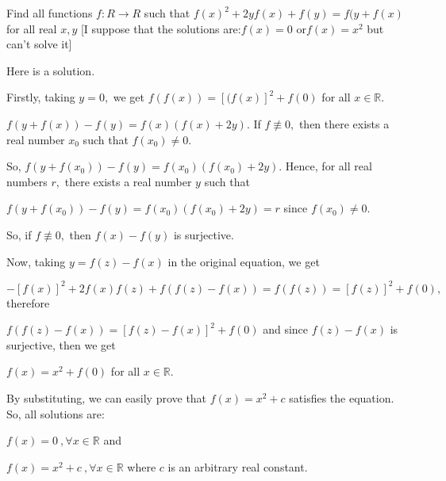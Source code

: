 \begin{solution}
	\begin{tcolorbox}Find all functions $f:R\rightarrow R $ such that $f(x)^2 +2yf(x)+f(y)=f(y+f(x)$ for all real $x,y$
[I suppose that the solutions are:$f(x)=0$ or$f(x)=x^2$ but can't solve it]\end{tcolorbox}
Here is a solution.

Firstly, taking $y=0,$ we get $f(f(x))=[(f(x)]^2+f(0)$ for all $x \in \mathbb{R}.$

$f(y+f(x))-f(y)=f(x)(f(x)+2y).$ If $f \not\equiv 0,$ then there exists a real number $x_0$ such that $f(x_0) \neq 0.$

So, $f(y+f(x_0))-f(y)=f(x_0)(f(x_0)+2y).$ Hence, for all real numbers $r,$ there exists a real number $y$ such that

$f(y+f(x_0))-f(y)=f(x_0)(f(x_0)+2y)=r$ since $f(x_0) \neq 0.$ 

So, if $f \not\equiv 0,$ then $f(x)-f(y)$ is surjective.

Now, taking $y=f(z)-f(x)$ in the original equation, we get

$-[f(x)]^2+2f(x)f(z)+f(f(z)-f(x))=f(f(z))=[f(z)]^2+f(0),$ therefore

$f(f(z)-f(x))=[f(z)-f(x)]^2+f(0)$ and since $f(z)-f(x)$ is surjective, then we get

$f(x)=x^2+f(0)$ for all $x \in \mathbb{R}.$

By substituting, we can easily prove that $f(x)=x^2+c$ satisfies the equation. So, all solutions are:

$f(x)=0 \: , \forall x \in \mathbb{R}$ and 

$f(x)=x^2+c \: , \forall x \in \mathbb{R}$ where $c$ is an arbitrary real constant.
\end{solution}



